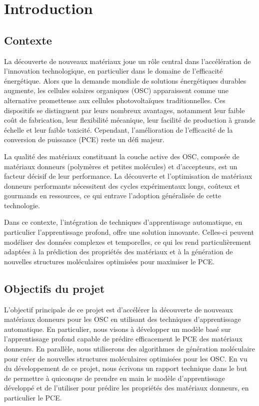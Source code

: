 \section{Introduction}
\subsection{Contexte}
La découverte de nouveaux matériaux joue un rôle central dans l'accélération de l'innovation technologique, en particulier dans le domaine de l'efficacité énergétique. 
Alors que la demande mondiale de solutions énergétiques durables augmente, les cellules solaires organiques (OSC) apparaissent comme une alternative prometteuse aux cellules photovoltaïques traditionnelles. 
Ces dispositifs se distinguent par leurs nombreux avantages, notamment leur faible coût de fabrication, leur flexibilité mécanique, leur facilité de production à grande échelle et leur faible toxicité. Cependant, l'amélioration de l'efficacité de la conversion de puissance (PCE) reste un défi majeur.

La qualité des matériaux constituant la couche active des OSC, composée de matériaux donneurs (polymères et petites molécules) et d'accepteurs, est un facteur décisif de leur performance. La découverte et l'optimisation de matériaux donneurs performants nécessitent des cycles expérimentaux longs, coûteux et gourmands en ressources, ce qui entrave l'adoption généralisée de cette technologie.

Dans ce contexte, l'intégration de techniques d'apprentissage automatique, en particulier l'apprentissage profond, offre une solution innovante. Celles-ci peuvent modéliser des données complexes et temporelles, ce qui les rend particulièrement adaptées à la prédiction des propriétés des matériaux et à la génération de nouvelles structures moléculaires optimisées pour maximiser le PCE.

\subsection{Objectifs du projet}
L'objectif principale de ce projet est d'accélérer la découverte de nouveaux matériaux donneurs pour les OSC en utilisant des techniques d'apprentissage automatique. 
En particulier, nous visons à développer un modèle basé sur l'apprentissage profond capable de prédire efficacement le PCE des matériaux donneurs. 
En parallèle, nous utiliserons des algorithmes de génération moléculaire pour créer de nouvelles structures moléculaires optimisées pour les OSC.
En vu du développement de ce projet, nous écrivons un rapport technique dans le but de permettre à quiconque de prendre en main le modèle d'apprentissage développé et de l'utiliser pour prédire les propriétés des matériaux donneurs, en particulier le PCE.